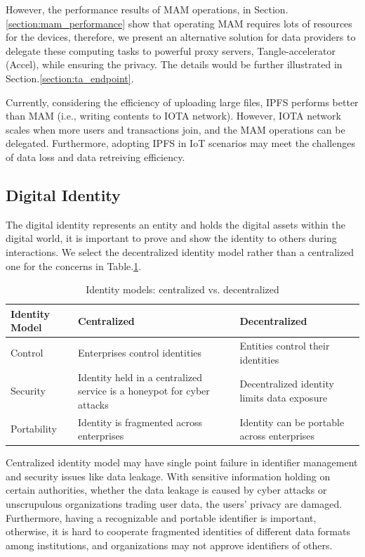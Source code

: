 \documentclass[conference]{IEEEtran}
\begin{document}
However, the performance results of MAM operations, in Section.\ref{section:mam_performance} show that operating MAM requires lots of resources for the devices, therefore, we present an alternative solution for data providers to delegate these computing tasks to powerful proxy servers, Tangle-accelerator (Accel)\cite{TA}, while ensuring the privacy. The details would be further illustrated in Section.\ref{section:ta_endpoint}.

Currently, considering the efficiency of uploading large files, IPFS performs better than MAM (i.e., writing contents to IOTA network). However, IOTA network scales when more users and transactions join, and the MAM operations can be delegated. Furthermore, adopting IPFS in IoT scenarios may meet the challenges of data loss and data retreiving efficiency.

\subsection{Digital Identity}
The digital identity represents an entity and holds the digital assets within the digital world, it is important to prove and show the identity to others during interactions. We select the decentralized identity model rather than a centralized one for the concerns in Table.\ref{tab:did}.
\begin{table}[h]
	\caption{Identity models: centralized vs. decentralized}
	\label{tab:did}
	\begin{tabularx}{\linewidth}{|l|X|X|}
	\hline
		\textbf{Identity Model} & \textbf{Centralized} & \textbf{Decentralized} \\
		\hline
		Control & Enterprises control identities & Entities control their identities \\
		\hline
		Security & Identity held in a centralized service is a honeypot for cyber attacks & Decentralized identity limits data exposure \\
		\hline
		Portability & Identity is fragmented across enterprises & Identity can be portable across enterprises \\
		\hline
	\end{tabularx}
\end{table}

Centralized identity model may have single point failure in identifier management and security issues like data leakage. With sensitive information holding on certain authorities, whether the data leakage is caused by cyber attacks or unscrupulous organizations trading user data, the users' privacy are damaged. Furthermore, having a recognizable and portable identifier is important, otherwise, it is hard to cooperate fragmented identities of different data formats among institutions, and organizations may not approve identifiers of others.
\end{document}
